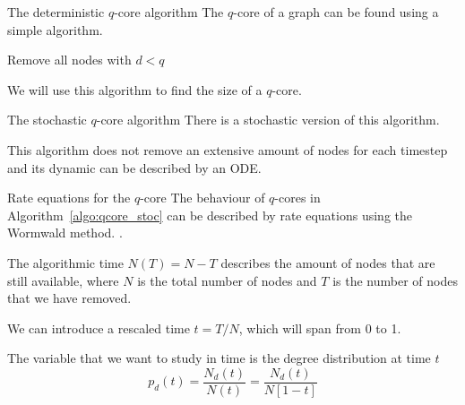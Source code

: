 \documentclass[handout]{beamer}
\begin{document}
\begin{frame}{The deterministic $q$-core algorithm}
    The $q$-core of a graph can be found using a simple algorithm.

    \begin{algorithm}[H]
        \begin{algorithmic}[1]
                \STATE Remove all nodes with $d<q$
            \ENDWHILE
        \end{algorithmic}
        \caption{Algorithm for deterministic $q$-core detection}
        \label{algo:qcore_det}
    \end{algorithm}

    We will use this algorithm to find the size of a $q$-core.
\end{frame}

\begin{frame}{The stochastic $q$-core algorithm}
    There is a stochastic version of this algorithm.

    \begin{algorithm}[H]
        \begin{algorithmic}[1]
            \ENDIF
            \ENDWHILE
        \end{algorithmic}
        \caption{Algorithm for stochastic $q$-core detection}
        \label{algo:qcore_stoc}
    \end{algorithm}

    This algorithm does not remove an extensive amount of nodes for each
    timestep and its dynamic can be described by an ODE.
\end{frame}

\begin{frame}{Rate equations for the $q$-core}
    The behaviour of $q$-cores in Algorithm~\ref{algo:qcore_stoc} can be
    described by \alert{rate equations} using the \alert{Wormwald method}.
    \cite[58]{weigt}.

    The algorithmic time $N(T) = N - T$ describes the amount of nodes that are
    still available, where $N$ is the total number of nodes and $T$ is the
    number of nodes that we have removed.

    We can introduce a \alert{rescaled time} $t = T / N$, which will span from 0
    to 1.

    The variable that we want to study in time is the \alert{degree
    distribution at time $t$}
    \begin{equation}
        p_d(t) = \frac{N_d(t)}{N(t)} = \frac{N_d(t)}{N[1-t]}
        \label{eq:deg_time}
    \end{equation}
\end{frame}
\end{document}
